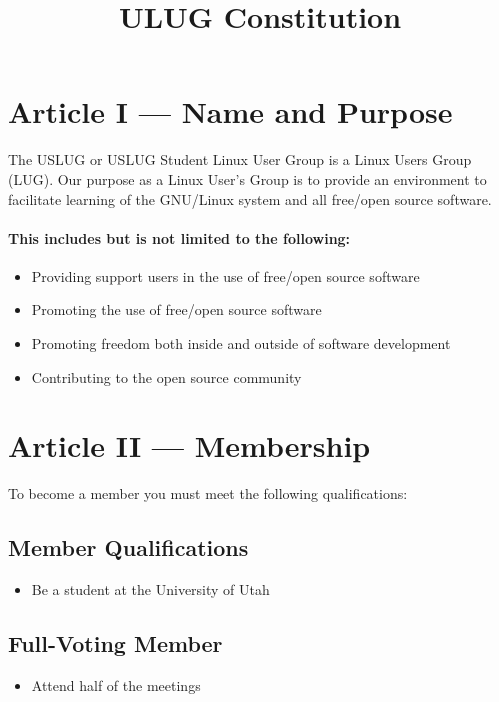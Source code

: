 \documentclass{article}
\begin{document}
\title{ULUG Constitution}

\section{Article I --- Name and Purpose}

The USLUG or USLUG Student Linux User Group is a Linux Users Group
(LUG). Our purpose as a Linux User's Group is to provide an environment
to facilitate learning of the GNU/Linux system and all free/open source
software.

\paragraph{This includes but is not limited to the following:}

\begin{itemize}
	\item
		Providing support users in the use of free/open source software
	\item
		Promoting the use of free/open source software
	\item
		Promoting freedom both inside and outside of software development
	\item
		Contributing to the open source community
\end{itemize}

\section{Article II --- Membership}

To become a member you must meet the following qualifications:

\subsection{Member Qualifications}

\begin{itemize}
	\item
		Be a student at the University of Utah
\end{itemize}

\subsection{Full-Voting Member}

\begin{itemize}
	\item
		Attend half of the meetings
\end{itemize}
\end{document}
